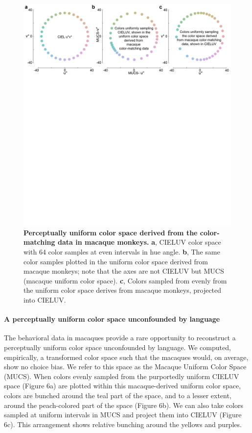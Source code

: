 \begin{figure}
    \begin{fullwidth}
    \centering
      \includegraphics[width=\textwidth+4cm,trim={0 15cm 0 0},clip]{../Figures/flat/F6_ColSpace_2}
           \caption{\textbf{Perceptually uniform color space derived from the color-matching data in macaque monkeys.} 
			\textbf{a}, CIELUV color space with 64 color samples at even intervals in hue angle. 
			\textbf{b}, The same color samples plotted in the uniform color space derived from macaque monkeys; note that the axes are not CIELUV but MUCS (macaque uniform color space). 
			\textbf{c}, Colors sampled from evenly from the uniform color space derives from macaque monkeys, projected into CIELUV.}
		\label{fig:MACBEHcolorspace}
    \end{fullwidth}
\end{figure}


\paragraph{A perceptually uniform color space unconfounded by language}

The behavioral data in macaques provide a rare opportunity to reconstruct a perceptually uniform color space unconfounded by language.
We computed, empirically, a transformed color space such that the macaques would, on average, show no choice bias. 
We refer to this space as the Macaque Uniform Color Space (MUCS). 
When colors evenly sampled from the purportedly uniform CIELUV space (Figure 6a) are plotted within this macaque-derived uniform color space, colors are bunched around the teal part of the space, and to a lesser extent, around the peach-colored part of the space (Figure 6b). 
We can also take colors sampled at uniform intervals in MUCS and project them into CIELUV (Figure 6c). This arrangement shows relative bunching around the yellows and purples.%

